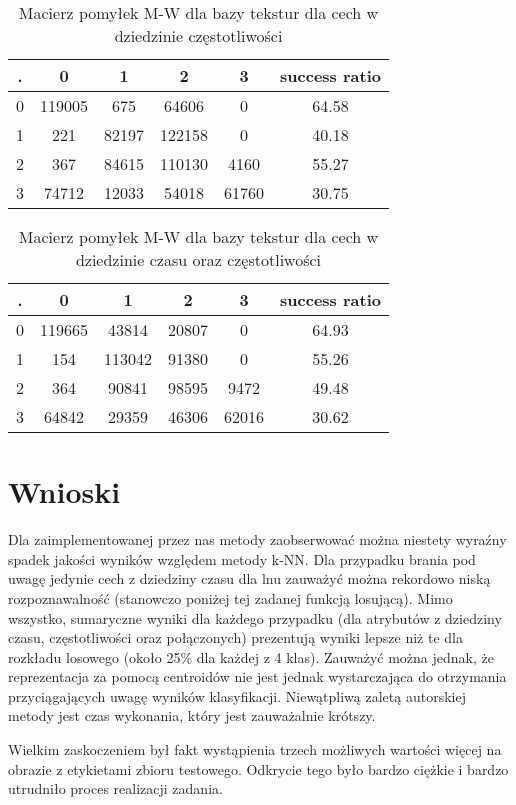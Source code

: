 \documentclass{classrep}
\begin{document}
\begin{table}[h!]
  \centering
  \caption{Macierz pomyłek M-W dla bazy tekstur dla cech w dziedzinie częstotliwości}
  \label{tab:tab1}
  \begin{tabular}{|c|c|c|c|c|c|}
    \hline
 . & 0 & 1 & 2 & 3 & success ratio \\
    \hline
 0 & 119005 & 675 & 64606 & 0 & 64.58\\
    \hline
 1 & 221 & 82197 & 122158 & 0 & 40.18\\
 \hline
 2 & 367 & 84615 & 110130 & 4160 & 55.27\\
 \hline
 3 & 74712 & 12033 & 54018 & 61760 & 30.75\\   
    \hline
  \end{tabular}
\end{table}

\begin{table}[h!]
  \centering
  \caption{Macierz pomyłek M-W dla bazy tekstur dla cech w dziedzinie czasu oraz częstotliwości}
  \label{tab:tab1}
  \begin{tabular}{|c|c|c|c|c|c|}
    \hline
 . & 0 & 1 & 2 & 3 & success ratio \\
    \hline
 0 & 119665 & 43814 & 20807 & 0 & 64.93\\
    \hline
 1 & 154 & 113042 & 91380 & 0 & 55.26\\
 \hline
 2 & 364 & 90841 & 98595 & 9472 & 49.48\\
 \hline
 3 & 64842 & 29359 & 46306 & 62016 & 30.62\\   
    \hline
  \end{tabular}
\end{table}


\section{Wnioski}

Dla zaimplementowanej przez nas metody zaobserwować można niestety wyraźny spadek jakości wyników względem metody k-NN. Dla przypadku brania pod uwagę jedynie cech z dziedziny czasu dla lnu zauważyć można rekordowo niską rozpoznawalność (stanowczo poniżej tej zadanej funkcją losującą). Mimo wszystko, sumaryczne wyniki dla każdego przypadku (dla atrybutów z dziedziny czasu, częstotliwości oraz połączonych) prezentują wyniki lepsze niż te dla rozkładu losowego (około 25\% dla każdej z 4 klas). Zauważyć można jednak, że reprezentacja za pomocą centroidów nie jest jednak wystarczająca do otrzymania przyciągających uwagę wyników klasyfikacji. Niewątpliwą zaletą autorskiej metody jest czas wykonania, który jest zauważalnie krótszy.

Wielkim zaskoczeniem był fakt wystąpienia trzech możliwych wartości więcej na obrazie z etykietami zbioru testowego. Odkrycie tego było bardzo ciężkie i bardzo utrudniło proces realizacji zadania.
\end{document}
